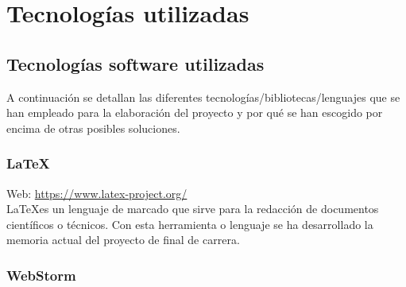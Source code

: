 \chapter[Herramientas utilizadas]{Tecnologías utilizadas}
\label{chap:herramientas}

\newpage

\section{Tecnologías software utilizadas}


A continuación se detallan las diferentes tecnologías/bibliotecas/lenguajes que se han empleado para la elaboración del proyecto y por qué se han escogido por encima de otras posibles soluciones.


\subsection{\LaTeX}

Web: \url{https://www.latex-project.org/}\\

\LaTeX es un lenguaje de marcado que sirve para la redacción de documentos científicos o técnicos. Con esta herramienta o lenguaje se ha desarrollado la memoria actual del proyecto de final de carrera.



\subsection{WebStorm}


